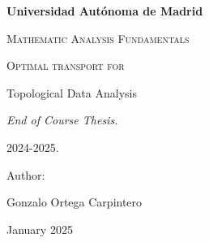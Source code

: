 \documentclass[12pt, a4paper]{article}
\theoremstyle{definition}
\newcommand{\authorname}{Gonzalo Ortega Carpintero}
\newcommand{\institution}{Universidad Autónoma de Madrid}
\newcommand{\projecttitle}{Optimal transport for

Topological Data Analysis}
\begin{document}
\begin{titlepage}
    \centering
    \vspace{1cm}
    {\bfseries\LARGE \institution \par}
    \vspace{1cm}
    {\scshape\Large Mathematic Analysis Fundamentals \par}
    \vspace{3cm}
    {\scshape\Huge \projecttitle \par}
    \vspace{3cm}
    {\itshape\Large End of Course Thesis.
    
    2024-2025. \par}
    \vfill
    {\Large Author: \par}
    {\Large \authorname \par}
    \vfill
    {\Large January 2025 \par}
\end{titlepage}

\setlength{\parskip}{0.75em}
\renewcommand{\baselinestretch}{1.25}


\pagebreak


\pagebreak


\pagebreak



\end{document}
